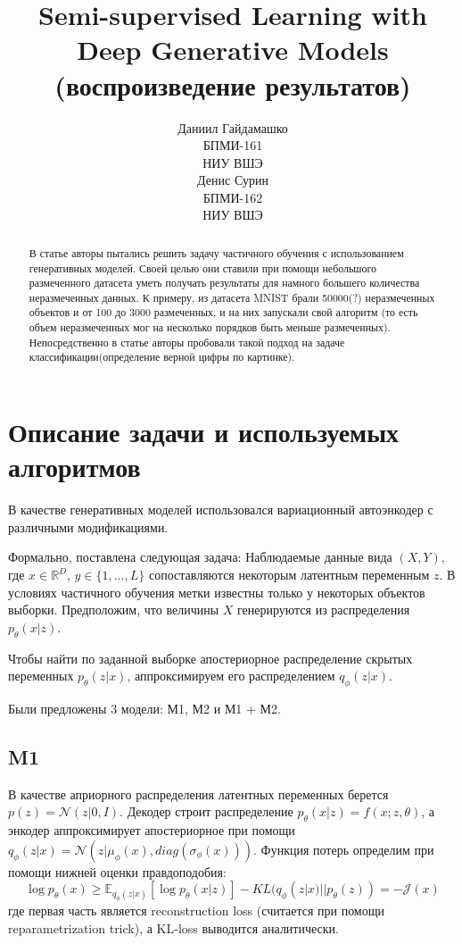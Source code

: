 \documentclass{article}
\title{Semi-supervised Learning with
Deep Generative Models\\
(воспроизведение результатов)}
\author{%
  Даниил Гайдамашко \\
  БПМИ-161\\
  НИУ ВШЭ\\
  \And
  Денис Сурин\\
  БПМИ-162\\
  НИУ ВШЭ\\
}
\begin{document}
\maketitle

\begin{abstract}
    В статье авторы пытались решить задачу частичного обучения с использованием генеративных моделей. 
    Своей целью они ставили при помощи небольшого размеченного датасета уметь получать результаты для намного большего количества неразмеченных данных. 
    К примеру, из датасета MNIST брали 50000(?) неразмеченных объектов и от 100 до 3000 размеченных, и на них запускали свой алгоритм (то есть объем неразмеченных мог на несколько порядков быть меньше размеченных). Непосредственно в статье авторы пробовали такой подход на задаче классификации(определение верной цифры по картинке).
\end{abstract}

\section{Описание задачи и используемых алгоритмов}

В качестве генеративных моделей использовался вариационный автоэнкодер с различными модификациями. 

Формально, поставлена следующая задача:
Наблюдаемые данные вида $(X, Y)$, где $x\in\mathbb{R}^D$, $y\in\{1, \dots, L\}$ сопоставляются некоторым латентным переменным $z$. 
В условиях частичного обучения метки известны только у некоторых объектов выборки.
Предположим, что величины $X$ генерируются из распределения $p_\theta(x|z)$. 

Чтобы найти по заданной выборке апостериорное распределение скрытых переменных $p_\theta(z|x)$, аппроксимируем его распределением $q_\phi(z|x)$.

Были предложены 3 модели: М1, М2 и М1 + М2. 
\subsection{M1}
В качестве априорного распределения латентных переменных берется $p(z) =  \mathcal{N}(z | 0, I)$.
Декодер строит распределение $p_\theta(x|z)=f(x;z, \theta)$, а энкодер аппроксимирует апостериорное при помощи $q_\phi(z|x)=\mathcal{N}(z|\mu_\phi(x), diag(\sigma_\phi(x)))$.
Функция потерь определим при помощи нижней оценки правдоподобия:
$$
\log p_\theta(x)
\geq
\mathbb{E}_{q_\phi(z|x)}\left[
    \log p_\theta(x|z)
    \right] - KL(q_\phi(z|x)||p_\theta(z))=-\mathcal{J}(x)
$$
где первая часть является reconstruction loss (считается при помощи reparametrization trick), а KL-loss выводится аналитически.
\end{document}
